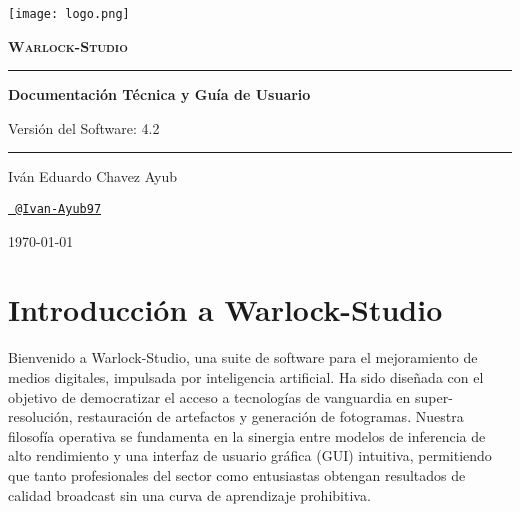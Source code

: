 \documentclass[11pt, a4paper]{article}
\newcommand{\SectionColor}{WarlockGray} %
\newcommand{\setsectioncolor}[1]{\renewcommand{\SectionColor}{#1}}
\begin{document}
\begin{titlepage}
    \begin{tcolorbox}[
        enhanced, sharp corners,
        colback=WarlockDark, colframe=WarlockGold,
        boxrule=2pt,
        height=\textheight,
        halign=center, valign=center
    ]
        \centering
        \texttt{[image: logo.png]}\par
        \vfill
        \color{WarlockWhite}
        {\Huge\bfseries\scshape Warlock-Studio\par}
        \vspace{1.5cm}
        \color{WarlockGold}
        \rule{0.6\textwidth}{1pt}\par
        \vspace{0.4cm}
        \color{WarlockWhite}
        {\Large\bfseries Documentación Técnica y Guía de Usuario\par}
        \vspace{0.2cm}
        {\large Versión del Software: 4.2\par}
        \vspace{0.4cm}
        \color{WarlockGold}
        \rule{0.6\textwidth}{1pt}\par
        \vfill
        {\large Iván Eduardo Chavez Ayub\par}
        \href{https://github.com/Ivan-Ayub97}{\texttt{\color{WarlockGold}\faGithub\ @Ivan-Ayub97}}\par
        \vspace{1.5cm}
        {\large \today\par}
    \end{tcolorbox}
    \thispagestyle{empty}
\end{titlepage}

\newpage
\tableofcontents
\newpage

\setsectioncolor{IntroColor}
\section{Introducción a Warlock-Studio}
Bienvenido a Warlock-Studio, una suite de software para el mejoramiento de medios digitales, impulsada por inteligencia artificial. Ha sido diseñada con el objetivo de democratizar el acceso a tecnologías de vanguardia en super-resolución, restauración de artefactos y generación de fotogramas. Nuestra filosofía operativa se fundamenta en la sinergia entre modelos de inferencia de alto rendimiento y una interfaz de usuario gráfica (GUI) intuitiva, permitiendo que tanto profesionales del sector como entusiastas obtengan resultados de calidad broadcast sin una curva de aprendizaje prohibitiva.
\end{document}
